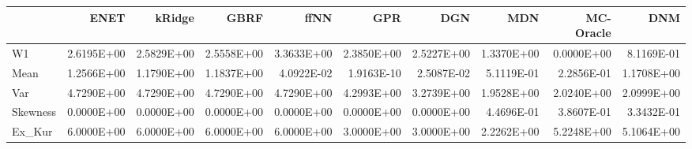 \begin{tabular}{lrrrrrrrrr}
\toprule
{} &       ENET &     kRidge &       GBRF &       ffNN &        GPR &        DGN &        MDN &  MC-Oracle &        DNM \\
\midrule
W1       & 2.6195E+00 & 2.5829E+00 & 2.5558E+00 & 3.3633E+00 & 2.3850E+00 & 2.5227E+00 & 1.3370E+00 & 0.0000E+00 & 8.1169E-01 \\
Mean     & 1.2566E+00 & 1.1790E+00 & 1.1837E+00 & 4.0922E-02 & 1.9163E-10 & 2.5087E-02 & 5.1119E-01 & 2.2856E-01 & 1.1708E+00 \\
Var      & 4.7290E+00 & 4.7290E+00 & 4.7290E+00 & 4.7290E+00 & 4.2993E+00 & 3.2739E+00 & 1.9528E+00 & 2.0240E+00 & 2.0999E+00 \\
Skewness & 0.0000E+00 & 0.0000E+00 & 0.0000E+00 & 0.0000E+00 & 0.0000E+00 & 0.0000E+00 & 4.4696E-01 & 3.8607E-01 & 3.3432E-01 \\
Ex\_Kur   & 6.0000E+00 & 6.0000E+00 & 6.0000E+00 & 6.0000E+00 & 3.0000E+00 & 3.0000E+00 & 2.2262E+00 & 5.2248E+00 & 5.1064E+00 \\
\bottomrule
\end{tabular}
